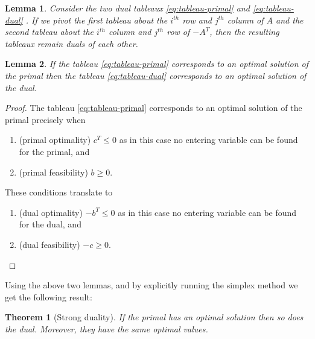 \documentclass[
]{book}
\providecommand{\tightlist}{%
  \setlength{\itemsep}{0pt}\setlength{\parskip}{0pt}}
\newtheorem{theorem}{Theorem}[chapter]
\newtheorem{lemma}{Lemma}[chapter]
\theoremstyle{definition}
\theoremstyle{definition}
\theoremstyle{definition}
\theoremstyle{definition}
\theoremstyle{remark}
\begin{document}
\begin{lemma}
\protect\hypertarget{lem:pivot}{}\label{lem:pivot}Consider the two dual tableaux \eqref{eq:tableau-primal} and \eqref{eq:tableau-dual} .
If we pivot the first tableau about the \(i^{th}\) row and \(j^{th}\) column of \(A\) and the second tableau about the \(i^{th}\) column and \(j^{th}\) row of \(-A^T\), then the resulting tableaux remain duals of each other.
\end{lemma}

\begin{lemma}
\protect\hypertarget{lem:optimality}{}\label{lem:optimality}If the tableau \eqref{eq:tableau-primal} corresponds to an optimal solution of the primal then the tableau \eqref{eq:tableau-dual} corresponds to an optimal solution of the dual.
\end{lemma}

\begin{proof}

The tableau \eqref{eq:tableau-primal} corresponds to an optimal solution of the primal precisely when

\begin{enumerate}
\def\labelenumi{\arabic{enumi}.}
\tightlist
\item
  (primal optimality) \(c^T \le 0\) as in this case no entering variable can be found for the primal, and
\item
  (primal feasibility) \(b \ge 0\).
\end{enumerate}

These conditions translate to

\begin{enumerate}
\def\labelenumi{\arabic{enumi}.}
\tightlist
\item
  (dual optimality) \(-b^T \le 0\) as in this case no entering variable can be found for the dual, and
\item
  (dual feasibility) \(-c \ge 0\).
\end{enumerate}

\end{proof}

Using the above two lemmas, and by explicitly running the simplex method we get the following result:

\begin{theorem}[Strong duality]
\protect\hypertarget{thm:strong-duality}{}\label{thm:strong-duality}If the primal has an optimal solution then so does the dual. Moreover, they have the same optimal values.
\end{theorem}
\end{document}
